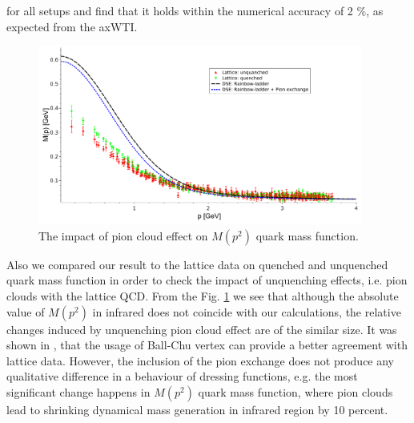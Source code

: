 for all setups and find that it holds within the numerical accuracy of 2 \%, 
as expected from the axWTI. 
\begin{figure}[h]
\tiny
 \begin{center}
  \includegraphics[width=0.95\textwidth]{figures/DSE_vs_Lattice}
 \end{center}
 \caption{\footnotesize The impact of pion cloud effect on $M(p^2)$ quark mass function.  }\label{fig:DSE_vs_Lattice} 
\end{figure}
	Also we compared our result to the lattice data on quenched and unquenched quark mass function in order to check the impact of unquenching effects, i.e. pion clouds with the lattice QCD. From the Fig. \ref{fig:DSE_vs_Lattice} we see that although the absolute value of $M(p^2)$ in infrared does not coincide with our calculations, the relative changes induced by unquenching pion cloud effect are of the similar size. It was shown in \cite{Fischer:2008sp}, that the usage of Ball-Chu vertex can provide a better agreement with lattice data. However, the inclusion of the pion exchange does not produce any qualitative difference in a behaviour of dressing functions, e.g. the most significant change happens in $M(p^2)$ quark mass function, where pion clouds lead to shrinking dynamical mass generation in infrared region by 10 percent. \\
		
